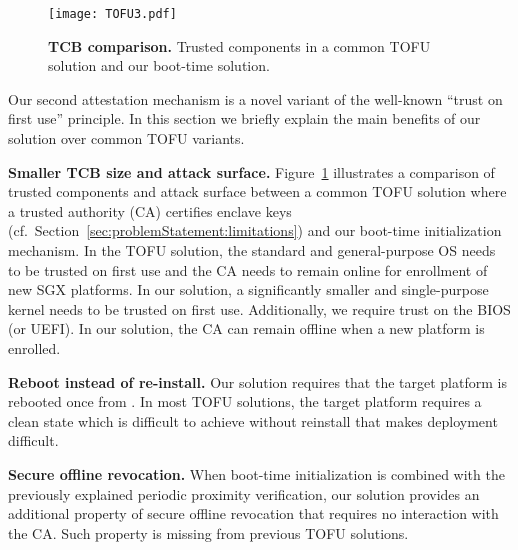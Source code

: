 \begin{figure}[t]
 \centering
  \texttt{[image: TOFU3.pdf]}
 \caption{\textbf{TCB comparison.} Trusted components in a common TOFU solution and our boot-time solution.}
 \figsaver
 \label{fig:TOFU}
\end{figure}



 Our second attestation mechanism is a novel variant of the well-known ``trust on first use'' principle. In this section we briefly explain the main benefits of our solution over common TOFU variants. 

\begin{mylist}
\item \textbf{Smaller TCB size and attack surface.} Figure~\ref{fig:TOFU} illustrates a comparison of trusted components and attack surface between a common TOFU solution where a trusted authority (CA) certifies enclave keys (cf.~Section~\ref{sec:problemStatement:limitations}) and our boot-time initialization mechanism. In the TOFU solution, the standard and general-purpose OS needs to be trusted on first use and the CA needs to remain online for enrollment of new SGX platforms. In our solution, a significantly smaller and single-purpose kernel needs to be trusted on first use. Additionally, we require trust on the BIOS (or UEFI). In our solution, the CA can remain offline when a new platform is enrolled.


\item \textbf{Reboot instead of re-install.} Our solution requires that the target platform is rebooted once from \device. In most TOFU solutions, the target platform requires a clean state which is difficult to achieve without reinstall that makes deployment difficult.


\item \textbf{Secure offline revocation.} When boot-time initialization is combined with the previously explained periodic proximity verification, our solution provides an additional property of secure offline revocation that requires no interaction with the CA. Such property is missing from previous TOFU solutions.

\end{mylist}

